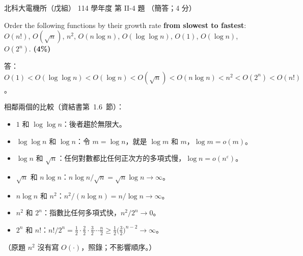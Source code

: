 \begin{pastexam}[label={px:ntut-114-ee-ds-08}]{北科大電機所（戊組） 114 學年度 第 II-4 題}
（簡答；4 分）

Order the following functions by their growth rate \textbf{from slowest to fastest}: $O(n!)$,
$O(\sqrt{n})$, $n^2$, $O(n\log n)$, $O(\log\log n)$, $O(1)$, $O(\log n)$, $O(2^n)$. \textbf{(4\%)}
\end{pastexam}

\begin{pastsoln}
答：$O(1) < O(\log \log n) < O(\log n) < O(\sqrt{n}) < O(n \log n) < n^2 < O(2^n) < O(n!)$。

相鄰兩個的比較（資結書第~1.6~節）：
\begin{itemize}
\item $1$ 和 $\log \log n$：後者趨於無限大。
\item $\log \log n$ 和 $\log n$：令 $m = \log n$，就是 $\log m$ 和 $m$，$\log m = o(m)$。
\item $\log n$ 和 $\sqrt{n}$：任何對數都比任何正次方的多項式慢，$\log n = o(n^{\varepsilon})$。
\item $\sqrt{n}$ 和 $n \log n$：$n \log n / \sqrt{n} = \sqrt{n} \log n \to \infty$。
\item $n \log n$ 和 $n^2$：$n^2 / (n \log n) = n / \log n \to \infty$。
\item $n^2$ 和 $2^n$：指數比任何多項式快，$n^2 / 2^n \to 0$。
\item $2^n$ 和 $n!$：$n! / 2^n = \frac{1}{2} \cdot \frac{2}{2} \cdot \frac{3}{2} \cdots \frac{n}{2} \ge \frac{1}{2}\bigl(\frac{3}{2}\bigr)^{n-2} \to \infty$。
\end{itemize}
（原題 $n^2$ 沒有寫 $O(\cdot)$，照錄；不影響順序。）
\end{pastsoln}

